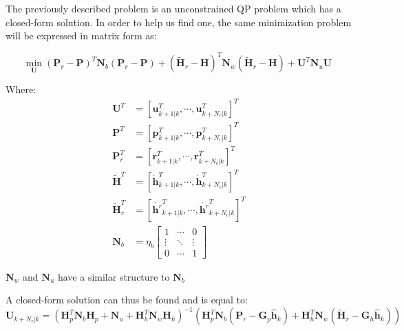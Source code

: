 \-The previously described problem is an unconstrained \-Q\-P problem which has a closed-\/form solution. \-In order to help us find one, the same minimization problem will be expressed in matrix form as\-:

\[ \underset{\mathbf{U}}{\text{min}} \; (\mathbf{P}_r - \mathbf{P})^T \mathbf{N}_b (\mathbf{P}_r - \mathbf{P}) + (\tilde{\mathbf{H}}_r - \mathbf{H})^T\mathbf{N}_w(\tilde{\mathbf{H}}_r - \mathbf{H}) + \mathbf{U}^T\mathbf{N}_u \mathbf{U} \]

\-Where\-: \begin{align*} \mathbf{U}^T &= \left[ \mathbf{u}^T_{k+1|k}, \cdots, \mathbf{u}^T_{k+N_c|k} \right]^T \\ \mathbf{P}^T &= \left[ \mathbf{p}^T_{k+1|k}, \cdots, \mathbf{p}^T_{k+N_c|k} \right]^T \\ \mathbf{P}^T_r &= \left[ \mathbf{r}^T_{k+1|k}, \cdots, \mathbf{r}^T_{k+N_c|k} \right]^T \\ \mathbf{\tilde{H}}^T &= \left[ \dot{\mathbf{h}}^T_{k+1|k}, \cdots, \dot{\mathbf{h}}^T_{k+N_c|k} \right]^T \\ \mathbf{\tilde{H}}^T_r &= \left[ \dot{\mathbf{h}^r}^T_{k+1|k}, \cdots, \dot{\mathbf{h}^r}^T_{k+N_c|k} \right]^T \\ \mathbf{N}_b &= \eta_b\left[\begin{array}{ccc} 1 & \cdots & 0 \\ \vdots & \ddots & \vdots\\ 0 & \cdots & 1 \end{array}\right] \end{align*}

$\mathbf{N}_w$ and $\mathbf{N}_u$ have a similar structure to $\mathbf{N}_b$

\-A closed-\/form solution can thus be found and is equal to\-: \[ \mathbf{U}_{k+N_c|k} = (\mathbf{H}_p^T \mathbf{N}_b \mathbf{H}_p + \mathbf{N}_u + \mathbf{H}_h^T \mathbf{N}_w \mathbf{H}_h)^{-1} \left(\mathbf{H}^T_p \mathbf{N}_b (\mathbf{P}_r - \mathbf{G}_p \hat{\mathbf{h}}_k) + \mathbf{H}^T_h\mathbf{N}_w(\tilde{\mathbf{H}}_r - \mathbf{G}_h \hat{\mathbf{h}}_k)\right) \] 

